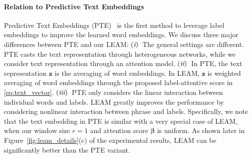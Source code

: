 \documentclass[11pt,a4paper]{article}
\newcommand{\zv}{\boldsymbol{z}}
\newcommand{\betav}[0]{{\boldsymbol{\beta}}}
\newcommand{\RN}[1]{\textup{\lowercase\expandafter{\it \romannumeral#1}}}
\begin{document}
\paragraph{Relation to Predictive Text Embeddings} 
Predictive Text Embeddings (PTE)~\citep{tang2015pte} is the first method to leverage label embeddings to improve the learned word embeddings. We discuss three major differences between PTE and our LEAM: 
$(\RN{1})$~The general settings are different. PTE casts the text representation through heterogeneous networks, while we consider text representation through an attention model.
$(\RN{2})$~In PTE, the text representation $\zv$ is the averaging of word embeddings. In LEAM, $\zv$ is weighted averaging of word embeddings through the proposed label-attentive score in \eqref{eq:text_vector}.
$(\RN{3})$~PTE only considers the linear interaction between individual words and labels. LEAM greatly improves the performance by considering nonlinear interaction between phrase and labels. 
Specifically, we note that the text embedding in PTE is similar with a very special case of LEAM, when our window size $r=1$ and attention score $\betav$ is uniform. As shown later in Figure~\ref{fig:leam_details}(c) of the experimental results, LEAM can be significantly better than the PTE variant.
\end{document}

